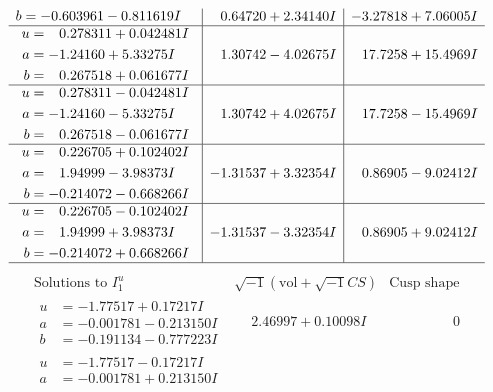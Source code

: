 \documentclass[1p]{elsarticle_modified}
\theoremstyle{definition}
\newcommand{\I}{\sqrt{-1}}
\begin{document}
$$\begin{array}{c|c|c}
\begin{aligned}
b &= -0.603961 - 0.811619 I\end{aligned}
 & \phantom{-}0.64720 + 2.34140 I & -3.27818 + 7.06005 I \\ \hline\begin{aligned}
u &= \phantom{-}0.278311 + 0.042481 I \\
a &= -1.24160 + 5.33275 I \\
b &= \phantom{-}0.267518 + 0.061677 I\end{aligned}
 & \phantom{-}1.30742 - 4.02675 I & \phantom{-}17.7258 + 15.4969 I \\ \hline\begin{aligned}
u &= \phantom{-}0.278311 - 0.042481 I \\
a &= -1.24160 - 5.33275 I \\
b &= \phantom{-}0.267518 - 0.061677 I\end{aligned}
 & \phantom{-}1.30742 + 4.02675 I & \phantom{-}17.7258 - 15.4969 I \\ \hline\begin{aligned}
u &= \phantom{-}0.226705 + 0.102402 I \\
a &= \phantom{-}1.94999 - 3.98373 I \\
b &= -0.214072 - 0.668266 I\end{aligned}
 & -1.31537 + 3.32354 I & \phantom{-}0.86905 - 9.02412 I \\ \hline\begin{aligned}
u &= \phantom{-}0.226705 - 0.102402 I \\
a &= \phantom{-}1.94999 + 3.98373 I \\
b &= -0.214072 + 0.668266 I\end{aligned}
 & -1.31537 - 3.32354 I & \phantom{-}0.86905 + 9.02412 I\\
 \hline 
 \end{array}$$\newpage$$\begin{array}{c|c|c}  
\text{Solutions to }I^u_{1}& \I (\text{vol} + \sqrt{-1}CS) & \text{Cusp shape}\\
 \hline 
\begin{aligned}
u &= -1.77517 + 0.17217 I \\
a &= -0.001781 - 0.213150 I \\
b &= -0.191134 - 0.777223 I\end{aligned}
 & \phantom{-}2.46997 + 0.10098 I & \phantom{-0.000000 } 0 \\ \hline\begin{aligned}
u &= -1.77517 - 0.17217 I \\
a &= -0.001781 + 0.213150 I \\

\end{aligned}
\end{array}$$
\end{document}
